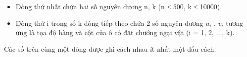 \begin{itemize}
	\item Dòng thứ nhất chứa hai số nguyên dương n, k (n ≤ 500, k ≤ 10000).
	\item Dòng thứ i trong số k dòng tiếp theo chứa 2 số nguyên dương $u_{i}$ , $v_{i}$ tương ứng là tọa độ hàng và cột của ô có đặt chướng ngại vật (i = 1, 2, ..., k).
\end{itemize}

Các số trên cùng một dòng được ghi cách nhau ít nhất một dấu cách.